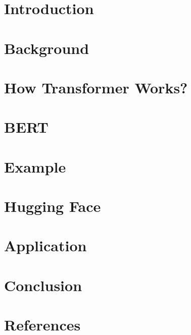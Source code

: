 \section[Intro]{Introduction}


\section[Back]{Background}



\section[How]{How Transformer Works?}



\section[BERT]{BERT}


\section[Ex]{Example}


\section[HF]{Hugging Face}


\section[Appln]{Application}


\section[Cncl]{Conclusion}


\section[Refs]{References}
